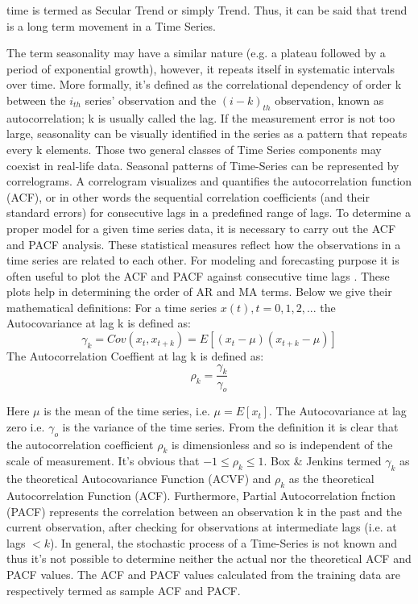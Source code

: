 time is termed as Secular Trend or simply Trend. Thus, it can be said that trend is a long term
movement in a Time Series. 
\par The term seasonality may have a similar nature (e.g. a plateau followed by a period of exponential growth), however, it repeats itself in systematic intervals over time. More formally, it's defined as the correlational dependency of order k between the $i_{th}$  series' observation and the $(i-k)_{th}$ observation, known as autocorrelation; k is usually called the lag. If the measurement error is not too large, seasonality can be visually identified in the series as a pattern that repeats every k elements. Those two general classes of Time Series components may coexist in real-life data. Seasonal patterns of Time-Series can be represented by correlograms. A correlogram visualizes and quantifies the autocorrelation function (ACF), or in other words the sequential correlation coefficients (and their standard errors) for consecutive lags in a predefined range of lags. To determine a proper model for a given time series data, it is necessary to carry out the ACF and PACF analysis. These statistical measures reflect how the observations in a time series are related to each other. For modeling and forecasting purpose it is often useful to plot the ACF and PACF against consecutive time lags \cite{hyndman2018forecasting}. These plots help in determining the order of AR and MA terms. Below we give their mathematical definitions:
For a time series ${x(t),t=0,1,2,...}$ the Autocovariance at lag k is defined as:
$$\gamma_{k}=Cov(x_{t},x_{t+k})=E[(x_t-\mu)(x_{t+k}-\mu)]$$
 The Autocorrelation Coeffient at lag k is defined as: 
$$\rho_k=\frac{\gamma_k}{\gamma_o}$$
\par Here $\mu$  is the mean of the time series, i.e. $\mu=E[x_{t}]$. The Autocovariance at lag zero i.e. $\gamma_{o}$ is the variance of the time series. From the definition it is clear that the autocorrelation coefficient $\rho_k$ is dimensionless and so is independent of the scale of measurement. It's obvious that $-1\leq \rho_{k} \leq 1$. Box \& Jenkins termed $\gamma_{k}$ as the theoretical Autocovariance Function (ACVF) and $\rho_{k}$ as the theoretical Autocorrelation Function (ACF). Furthermore, Partial Autocorrelation fnction (PACF) represents the correlation between an observation k in the past and the current observation, after checking for observations at intermediate lags (i.e. at lags $<k$). In general, the stochastic process of a Time-Series is not known and thus it's not possible to determine neither the actual nor the theoretical ACF and PACF values. The ACF and PACF values calculated from the training data are respectively termed as sample ACF and PACF. 
\newpage

